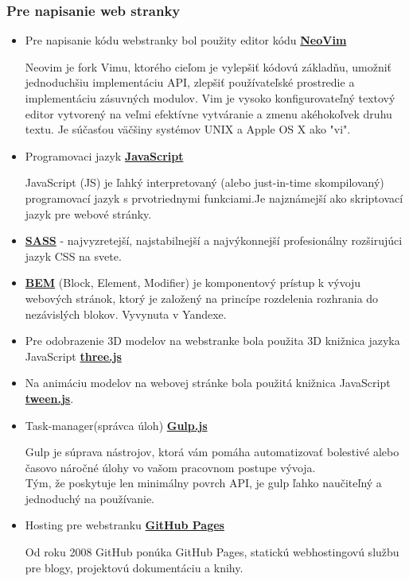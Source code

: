       \subsubsection{Pre napisanie web stranky}
        \begin{itemize}
          \item{
            Pre napisanie kódu webstranky bol použity editor kódu \textbf{\href{https://neovim.io/}{NeoVim}}

            Neovim je fork Vimu, ktorého cieľom je vylepšiť kódovú základňu, umožniť jednoduchšiu implementáciu API, zlepšiť používateľské prostredie a implementáciu zásuvných modulov.
            Vim je vysoko konfigurovateľný textový editor vytvorený na veľmi efektívne vytváranie a zmenu akéhokoľvek druhu textu. Je súčasťou väčšiny systémov UNIX a Apple OS X ako "vi".
          }
          \item{
            Programovaci jazyk \textbf{\href{https://developer.mozilla.org/en-US/docs/Web/JavaScript}{JavaScript}}

            JavaScript (JS) je ľahký interpretovaný (alebo just-in-time skompilovaný) programovací jazyk s prvotriednymi funkciami.Je najznámejší ako skriptovací jazyk pre webové stránky.
          }
          \item{
            \textbf{\href{https://sass-lang.com/}{SASS}} - najvyzretejší, najstabilnejší a najvýkonnejší profesionálny rozširujúci jazyk CSS na svete.
          }
          \item{
            \textbf{\href{https://yandex.ru/dev/bem/}{BEM}} (Block, Element, Modifier) je komponentový prístup k vývoju webových stránok, ktorý je založený na princípe rozdelenia rozhrania do nezávislých blokov. Vyvynuta v Yandexe.
          }
          \item{
            Pre odobrazenie 3D modelov na webstranke bola použita 3D knižnica jazyka JavaScript \textbf{\href{https://github.com/mrdoob/three.js/}{three.js}}
          }
          \item{
            Na animáciu modelov na webovej stránke bola použitá knižnica JavaScript \textbf{\href{https://tweenjs.github.io/tween.js/}{tween.js}}.
          }
          \item{
            Task-manager(správca úloh) \textbf{\href{https://gulpjs.com}{Gulp.js}}

            Gulp je súprava nástrojov, ktorá vám pomáha automatizovať bolestivé alebo časovo náročné úlohy vo vašom pracovnom postupe vývoja. \\
            Tým, že poskytuje len minimálny povrch API, je gulp ľahko naučiteľný a jednoduchý na používanie.
          }
          \item{
            Hosting pre webstranku \textbf{\href{https://pages.github.com/}{GitHub Pages}} 

            Od roku 2008 GitHub ponúka GitHub Pages, statickú webhostingovú službu pre blogy, projektovú dokumentáciu a knihy.
          }
        \end{itemize}

